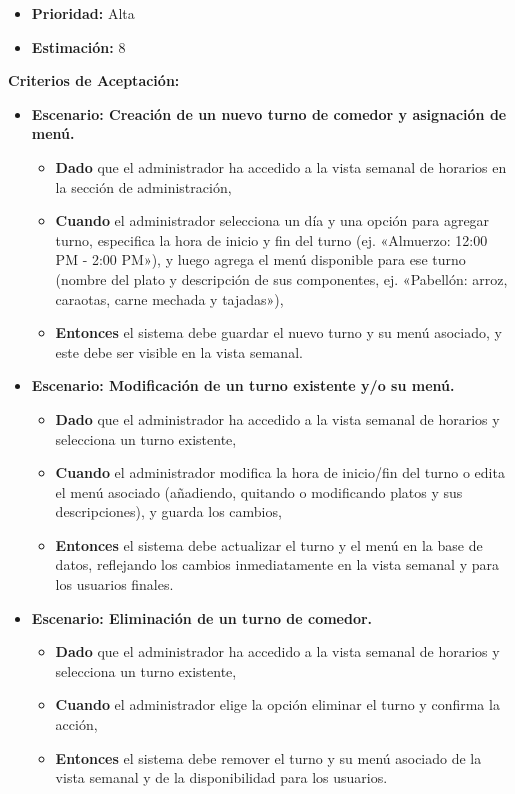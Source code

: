 \documentclass[12pt]{article}
\begin{document}
\begin{itemize}
    \item \textbf{Prioridad:} Alta
    \item \textbf{\textbf{Estimación:}} 8
\end{itemize}

\textbf{Criterios de Aceptación:}
\begin{itemize}
    \item \textbf{Escenario: Creación de un nuevo turno de comedor y asignación de menú.}
    \begin{itemize}
        \item \textbf{Dado} que el administrador ha accedido a la vista semanal de horarios en la sección de administración,
        \item \textbf{Cuando} el administrador selecciona un día y una opción para agregar turno, especifica la hora de inicio y fin del turno (ej. «Almuerzo: 12:00 PM - 2:00 PM»), y luego agrega el menú disponible para ese turno (nombre del plato y descripción de sus componentes, ej. «Pabellón: arroz, caraotas, carne mechada y tajadas»),
        \item \textbf{Entonces} el sistema debe guardar el nuevo turno y su menú asociado, y este debe ser visible en la vista semanal.
    \end{itemize}

    \item \textbf{Escenario: Modificación de un turno existente y/o su menú.}
    \begin{itemize}
        \item \textbf{Dado} que el administrador ha accedido a la vista semanal de horarios y selecciona un turno existente,
        \item \textbf{Cuando} el administrador modifica la hora de inicio/fin del turno o edita el menú asociado (añadiendo, quitando o modificando platos y sus descripciones), y guarda los cambios,
        \item \textbf{Entonces} el sistema debe actualizar el turno y el menú en la base de datos, reflejando los cambios inmediatamente en la vista semanal y para los usuarios finales.
    \end{itemize}

    \item \textbf{Escenario: Eliminación de un turno de comedor.}
    \begin{itemize}
        \item \textbf{Dado} que el administrador ha accedido a la vista semanal de horarios y selecciona un turno existente,
        \item \textbf{Cuando} el administrador elige la opción eliminar el turno y confirma la acción,
        \item \textbf{Entonces} el sistema debe remover el turno y su menú asociado de la vista semanal y de la disponibilidad para los usuarios.
    \end{itemize}
\end{itemize}
\end{document}
